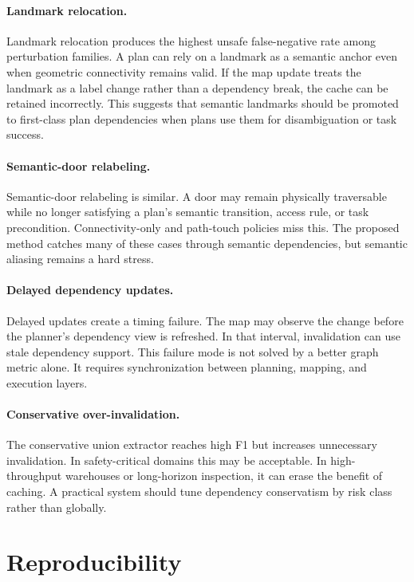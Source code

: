 \documentclass{article}
\begin{document}
\paragraph{Landmark relocation.}
Landmark relocation produces the highest unsafe false-negative rate among perturbation families. A plan can rely on a landmark as a semantic anchor even when geometric connectivity remains valid. If the map update treats the landmark as a label change rather than a dependency break, the cache can be retained incorrectly. This suggests that semantic landmarks should be promoted to first-class plan dependencies when plans use them for disambiguation or task success.

\paragraph{Semantic-door relabeling.}
Semantic-door relabeling is similar. A door may remain physically traversable while no longer satisfying a plan's semantic transition, access rule, or task precondition. Connectivity-only and path-touch policies miss this. The proposed method catches many of these cases through semantic dependencies, but semantic aliasing remains a hard stress.

\paragraph{Delayed dependency updates.}
Delayed updates create a timing failure. The map may observe the change before the planner's dependency view is refreshed. In that interval, invalidation can use stale dependency support. This failure mode is not solved by a better graph metric alone. It requires synchronization between planning, mapping, and execution layers.

\paragraph{Conservative over-invalidation.}
The conservative union extractor reaches high F1 but increases unnecessary invalidation. In safety-critical domains this may be acceptable. In high-throughput warehouses or long-horizon inspection, it can erase the benefit of caching. A practical system should tune dependency conservatism by risk class rather than globally.

\section{Reproducibility}
\end{document}
